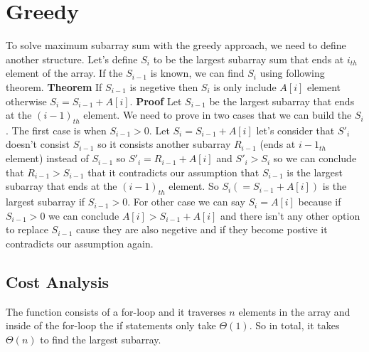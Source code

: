 \section{Greedy}
To solve maximum subarray sum with the 
greedy approach, we need to define another 
structure. Let's define $S_i$ to be 
the largest subarray sum that ends at $i_{th}$ 
element of the array. If the $S_{i-1}$ is 
known, we can find $S_i$ using following theorem.
\newline
\newline
\textbf{Theorem}
\newline
If $S_{i-1}$ is negetive then $S_i$ is only include $A[i]$ 
element otherwise $S_i = S_{i-1} + A[i] $.
\newline
\newline
\textbf{Proof} \quad Let $S_{i-1}$ be the largest 
subarray that ends at the $(i-1)_{th}$ element.
We need to prove in two cases that we can build 
the $S_i$. The first case is when $S_{i-1}>0$. 
Let $S_{i}=S_{i-1} + A[i]$ let's consider that 
$S'_{i}$ doesn't consist $S_{i-1}$ so it consists 
another subarray $R_{i-1}$ (ends at $i-1_{th}$ 
element) instead of $S_{i-1}$ so $S'_i = R_{i-1} 
+ A[i]$ and $S'_i > S_i$ so we can conclude that 
$R_{i-1} > S_{i-1}$ that it contradicts our 
assumption that $S_{i-1}$ is the largest subarray 
that ends at the $(i-1)_{th}$ element. So 
$S_{i}(=S_{i-1} + A[i])$ is the largest subarray if 
$S_{i-1}>0$. For other case we can say
$S_i = A[i]$ because if $S_{i-1}>0$ we can conclude 
$A[i]> S_{i-1} + A[i]$ and there isn't any other 
option to replace $S_{i-1}$ cause they are also 
negetive and if they become postive it contradicts 
our assumption again.


\subsection{Cost Analysis}
The function consists of a for-loop and it 
traverses $n$ elements in the array and inside 
of the for-loop the if statements only take 
$\Theta(1)$. So in total, it takes $\Theta(n)$ 
to find the largest subarray.